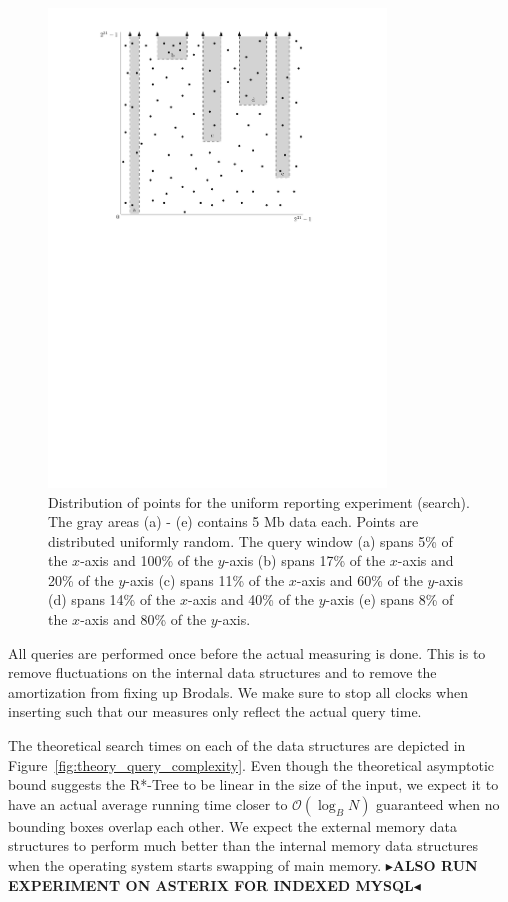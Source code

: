 \documentclass[twoside,11pt,openright]{report}
\newcommand{\todo}[1]{{\color[rgb]{.5,0,0}\textbf{$\blacktriangleright$#1$\blacktriangleleft$}}}
\begin{document}
\begin{figure}[h]
	\centering
	\includegraphics[width=0.80\textwidth]{../figures/query_uniform}
	\caption{Distribution of points for the uniform reporting experiment (search). The gray areas (a) - (e) contains 5 Mb data each. Points are distributed uniformly random. The query window (a) spans 5\% of the $x$-axis and 100\% of the $y$-axis (b) spans 17\% of the $x$-axis and 20\% of the $y$-axis (c) spans 11\% of the $x$-axis and 60\% of the $y$-axis (d) spans 14\% of the $x$-axis and 40\% of the $y$-axis (e) spans 8\% of the $x$-axis and 80\% of the $y$-axis.}
	\label{fig:experiment_query_uniform}
\end{figure}

All queries are performed once before the actual measuring is done. This is to remove fluctuations on the internal data structures and to remove the amortization from fixing up Brodals. We make sure to stop all clocks when inserting such that our measures only reflect the actual query time.

The theoretical search times on each of the data structures are depicted in Figure~\ref{fig:theory_query_complexity}. Even though the theoretical asymptotic bound suggests the R*-Tree to be linear in the size of the input, we expect it to have an actual average running time closer to $\mathcal{O}(\log_B N)$ guaranteed when no bounding boxes overlap each other. We expect the external memory data structures to perform much better than the internal memory data structures when the operating system starts swapping of main memory. \todo{ALSO RUN EXPERIMENT ON ASTERIX FOR INDEXED MYSQL}
\end{document}
